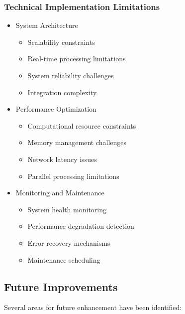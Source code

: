 \documentclass[conference]{IEEEtran}
\begin{document}
\subsubsection{Technical Implementation Limitations}
\begin{itemize}
    \item System Architecture
    \begin{itemize}
        \item Scalability constraints
        \item Real-time processing limitations
        \item System reliability challenges
        \item Integration complexity
    \end{itemize}
    
    \item Performance Optimization
    \begin{itemize}
        \item Computational resource constraints
        \item Memory management challenges
        \item Network latency issues
        \item Parallel processing limitations
    \end{itemize}
    
    \item Monitoring and Maintenance
    \begin{itemize}
        \item System health monitoring
        \item Performance degradation detection
        \item Error recovery mechanisms
        \item Maintenance scheduling
    \end{itemize}
\end{itemize}

\subsection{Future Improvements}
Several areas for future enhancement have been identified:
\end{document}
